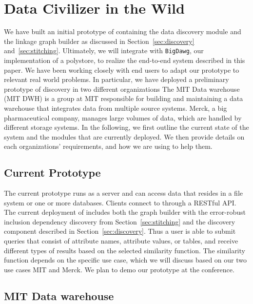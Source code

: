 \section{Data Civilizer in the Wild}
\label{sec:wild}

We have built an initial prototype of \dcv containing the data discovery module
and the linkage graph builder as discussed in Section~\ref{sec:discovery} and~\ref{sec:stitching}. Ultimately, we will integrate \dcv with
\texttt{BigDawg}, our implementation of a polystore, to realize the end-to-end
system described in this paper.  We have been working closely with end users to
adapt our prototype to relevant real world problems.  In particular, we have deployed
a preliminary prototype of discovery in two different organizations The MIT Data
warehouse (MIT DWH) is a group at MIT responsible for building and maintaining a
data warehouse that integrates data from multiple source systems. Merck, a big
pharmaceutical company, manages large volumes of data, which are handled by
different storage systems.  In the following, we first outline the current state
of the system and the modules that are currently deployed.  We then provide
details on each organizations' requirements, and how we are using \dcv to help
them.

\subsection{Current \titledcv Prototype} 

The current prototype runs as a
server and can access data that resides in a file system or one or more
databases.  Clients  connect to \dcv through a RESTful API.  The current
deployment of \dcv  includes both  the graph builder with the error-robust
inclusion dependency discovery from Section~\ref{sec:stitching} and the
discovery component described in Section~\ref{sec:discovery}.  Thus a user is
able to submit queries that consist of attribute names, attribute values, or
tables, and receive different types of results based on the selected
similarity function. The similarity function depends on the specific use case,
which we will discuss based on our two use cases MIT and Merck.  We plan to
demo our \dcv prototype at the conference.

\subsection{MIT Data warehouse}

